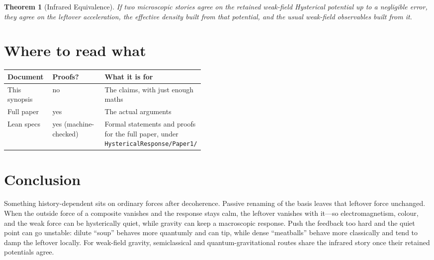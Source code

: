 \documentclass[11pt]{article}
\newtheorem{theorem}{Theorem}[section]
\theoremstyle{remark}
\begin{document}
\begin{theorem}[Infrared Equivalence]
If two microscopic stories agree on the retained weak-field Hysterical potential up to a negligible error, they agree on the leftover acceleration, the effective density built from that potential, and the usual weak-field observables built from it.
\end{theorem}

\section{Where to read what}
\begin{center}
\begin{tabular}{@{}llp{0.46\linewidth}@{}}
\toprule
Document & Proofs? & What it is for \\
\midrule
This synopsis & no & The claims, with just enough maths \\
Full paper & yes & The actual arguments \\
Lean specs & yes (machine-checked) & Formal statements and proofs for the full paper, under \texttt{HystericalResponse/Paper1/} \\
\bottomrule
\end{tabular}
\end{center}

\section{Conclusion}
Something history-dependent sits on ordinary forces after decoherence.
Passive renaming of the basis leaves that leftover force unchanged.
When the outside force of a composite vanishes and the response stays calm, the leftover vanishes with it---so electromagnetism, colour, and the weak force can be hysterically quiet, while gravity can keep a macroscopic response.
Push the feedback too hard and the quiet point can go unstable: dilute ``soup'' behaves more quantumly and can tip, while dense ``meatballs'' behave more classically and tend to damp the leftover locally.
For weak-field gravity, semiclassical and quantum-gravitational routes share the infrared story once their retained potentials agree.
\end{document}
